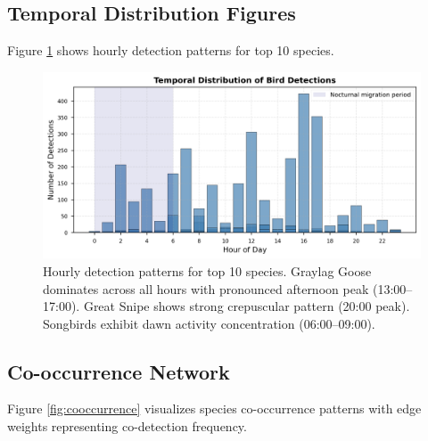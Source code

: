 \documentclass[twocolumn]{article}
\begin{document}
\subsection{Temporal Distribution Figures}

Figure \ref{fig:temporal} shows hourly detection patterns for top 10 species.

\begin{figure}[H]
\centering
\includegraphics[width=\textwidth]{figures/temporal_distribution.png}
\caption{Hourly detection patterns for top 10 species. Graylag Goose dominates across all hours with pronounced afternoon peak (13:00--17:00). Great Snipe shows strong crepuscular pattern (20:00 peak). Songbirds exhibit dawn activity concentration (06:00--09:00).}
\label{fig:temporal}
\end{figure}

\subsection{Co-occurrence Network}

Figure \ref{fig:cooccurrence} visualizes species co-occurrence patterns with edge weights representing co-detection frequency.
\end{document}
